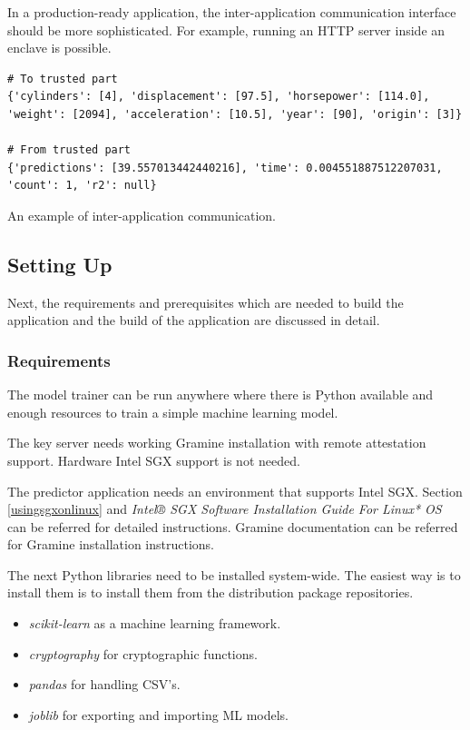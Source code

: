 In a production-ready application, the inter-application communication interface should be more sophisticated. For example, running an HTTP server inside an enclave is possible.

\begin{algorithm}
\begin{verbatim}
# To trusted part
{'cylinders': [4], 'displacement': [97.5], 'horsepower': [114.0],
'weight': [2094], 'acceleration': [10.5], 'year': [90], 'origin': [3]}

# From trusted part
{'predictions': [39.557013442440216], 'time': 0.004551887512207031,
'count': 1, 'r2': null}
\end{verbatim}
\caption{An example of inter-application communication.\label{alg:communication}}
\end{algorithm}

\subsection{Setting Up} \label{settingup}

Next, the requirements and prerequisites which are needed to build the application and the build of the application are discussed in detail.

\subsubsection{Requirements} \label{requirements}

The model trainer can be run anywhere where there is Python available and enough resources to train a simple machine learning model.

The key server needs working Gramine installation with remote attestation support. Hardware Intel SGX support is not needed.

The predictor application needs an environment that supports Intel SGX. Section \ref{usingsgxonlinux} and \textit{Intel® SGX Software Installation Guide For Linux* OS}\cite{sgxinstall} can be referred for detailed instructions. Gramine documentation\cite{graminedocs} can be referred for Gramine installation instructions.

The next Python libraries need to be installed system-wide. The easiest way is to install them is to install them from the distribution package repositories.

\begin{itemize}
  \item \textit{scikit-learn} as a machine learning framework.
  \item \textit{cryptography} for cryptographic functions.
  \item \textit{pandas} for handling CSV's.
  \item \textit{joblib} for exporting and importing ML models.
\end{itemize}

